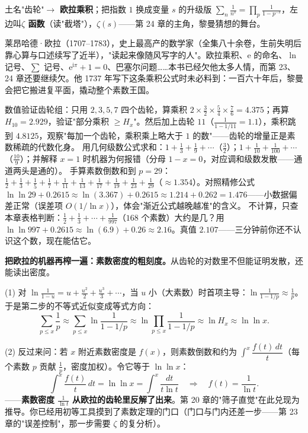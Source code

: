 \begin{cidian}
土名"齿轮"$\to$ \textbf{欧拉乘积}；把指数 $1$ 换成变量 $s$ 的升级版 $\displaystyle\sum_n \frac{1}{n^s} = \prod_p \frac{1}{1-p^{-s}}$，左边叫\textbf{$\zeta$ 函数}（读"截塔"），$\zeta(s)$——第 24 章的主角，黎曼猜想的舞台。
\end{cidian}

\begin{lishi}
莱昂哈德·欧拉（1707--1783），史上最高产的数学家（全集八十余卷，生前失明后靠心算与口述续写了近半），"读起来像随风写字的人"。欧拉乘积、$\mathrm{e}$ 的命名、$\ln$ 记号、$\sum$ 记号、$\mathrm{e}^{\mathrm{i}\pi}+1=0$、巴塞尔问题……本书已经欠他太多人情，而第 23、24 章还要继续欠。他 1737 年写下这条乘积公式时未必料到：一百六十年后，黎曼会把它搬进复平面，撬动整个素数王国。
\end{lishi}

\begin{dongshou}
\begin{itemize}
  \yisi 数值验证齿轮组：只用 $2, 3, 5, 7$ 四个齿轮，算乘积 $2\times\tfrac32\times\tfrac54\times\tfrac76 = 4.375$；再算 $H_{10} = 2.929$，验证"部分乘积 $\ge H_x$"。然后加上齿轮 $11$（$\tfrac{1}{1-1/11} = 1.1$），乘积跳到 $4.8125$，观察"每加一个齿轮，乘积乘上略大于 $1$ 的数"——齿轮的增量正是素数稀疏的代数化身。
  \yier 用几何级数公式求和：$1 + \tfrac13 + \tfrac19 + \cdots$（$\tfrac32$）；$1 + \tfrac1{10} + \tfrac1{100}+\cdots$（$\tfrac{10}{9}$）；并解释 $x = 1$ 时机器为何报错（分母 $1-x = 0$，对应调和级数发散——通道两头是通的）。
  \yier 手算素数倒数和到 $p = 29$：$\tfrac12+\tfrac13+\tfrac15+\tfrac17+\tfrac1{11}+\tfrac1{13}+\tfrac1{17}+\tfrac1{19}+\tfrac1{23}+\tfrac1{29}$（$\approx 1.354$）。对照精修公式 $\ln\ln 29 + 0.2615 \approx \ln(3.367) + 0.2615 \approx 1.214 + 0.262 = 1.476$——小数据偏差正常（误差项 $O(1/\ln x)$），体会"渐近公式越晚越准"的含义。
  \yisi 不计算，只查本章表格判断：$\tfrac12+\tfrac13+\cdots+\tfrac1{997}$（$168$ 个素数）大约是几？用 $\ln\ln 997 + 0.2615 \approx \ln(6.9) + 0.26 \approx 2.16$。真值 $2.107$——三分钟前你还不认识这个数，现在能估它。
\end{itemize}
\end{dongshou}

\begin{shaonao}
\textbf{把欧拉的机器再榨一遍：素数密度的粗刻度。}从齿轮的对数里不但能证明发散，还能读出密度。

(1) 对 $\ln\tfrac1{1-u} = u + \tfrac{u^2}{2} + \tfrac{u^3}{3}+\cdots$，当 $u$ 小（大素数）时首项主导：$\ln\tfrac1{1-1/p} \approx \tfrac1p$。于是第二步的不等式近似变成等式方向：
\[
\sum_{p\le x}\frac1p \approx \sum_{p\le x}\ln\frac1{1-1/p} \approx \ln\prod_{p\le x}\frac1{1-1/p} \approx \ln H_x \approx \ln\ln x .
\]

(2) 反过来问：若 $x$ 附近素数密度是 $f(x)$，则素数倒数和约为 $\int^x \dfrac{f(t)\,dt}{t}$（每个素数 $p$ 贡献 $\tfrac1p$，密度加权）。令它等于 $\ln\ln x$：
\[
\int^x\frac{f(t)}{t}\,dt = \ln\ln x = \int^x\frac{dt}{t\ln t} \quad\Longrightarrow\quad f(t) = \frac{1}{\ln t} .
\]
——\textbf{素数密度 $\tfrac1{\ln t}$ 从欧拉的齿轮里反解了出来}。第 20 章的"筛子直觉"在此兑现为推导。你已经用初等工具摸到了素数定理的门口（门口与门内还差一步——第 23 章的"误差控制"，那一步需要 $\zeta$ 的复分析）。
\end{shaonao}

